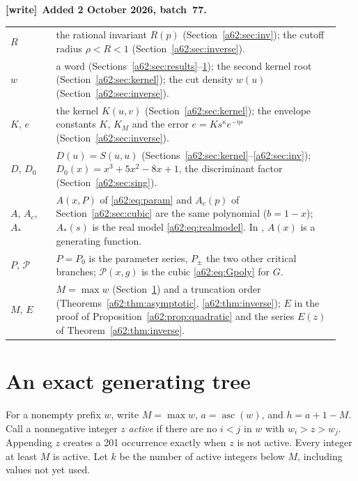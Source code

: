 \documentclass[11pt,letterpaper]{article}
\theoremstyle{remark}\newtheorem{remark}[theorem]{Remark}
\newcommand{\asc}{\operatorname{asc}}
\newenvironment{writenote}[1][]{\par\smallskip\begingroup\small
 \noindent\textbf{[write]}\if\relax\detokenize{#1}\relax\else~\textbf{#1.}\fi\ }%
 {\par\endgroup\smallskip}
\begin{document}
\begin{writenote}[Added 2 October 2026, batch~77]
\begin{center}
\begin{tabular}{@{}p{0.13\linewidth}p{0.81\linewidth}@{}}
$R$ & the rational invariant $R(p)$ (Section~\ref{a62:sec:inv}); the cutoff radius $\rho<R<1$ (Section~\ref{a62:sec:inverse}).\\
$w$ & a word (Sections~\ref{a62:sec:results}--\ref{a62:sec:tree}); the second kernel root (Section~\ref{a62:sec:kernel}); the cut density $w(u)$ (Section~\ref{a62:sec:inverse}).\\
$K$, $e$ & the kernel $K(u,v)$ (Section~\ref{a62:sec:kernel}); the envelope constants $K$, $K_M$ and the error $e=Ks^\kappa e^{-\eta s}$ (Section~\ref{a62:sec:inverse}).\\
$D$, $D_0$ & $D(u)=S(u,u)$ (Sections~\ref{a62:sec:kernel}--\ref{a62:sec:inv}); $D_0(x)=x^3+5x^2-8x+1$, the discriminant factor (Section~\ref{a62:sec:sing}).\\
$A$, $A_c$, $A_*$ & $A(x,P)$ of \eqref{a62:eq:param} and $A_c(p)$ of Section~\ref{a62:sec:cubic} are the same polynomial ($b=1-x$); $A_*(s)$ is the real model \eqref{a62:eq:realmodel}. In \cite{a62-a61}, $A(x)$ is a generating function.\\
$P$, $\mathcal P$ & $P=P_0$ is the parameter series, $P_\pm$ the two other critical branches; $\mathcal P(x,g)$ is the cubic \eqref{a62:eq:Gpoly} for $G$.\\
$M$, $E$ & $M=\max w$ (Section~\ref{a62:sec:tree}) and a truncation order (Theorems~\ref{a62:thm:asymptotic}, \ref{a62:thm:inverse}); $E$ in the proof of Proposition~\ref{a62:prop:quadratic} and the series $E(z)$ of Theorem~\ref{a62:thm:inverse}.\\
\bottomrule
\end{tabular}
\end{center}
\end{writenote}

\section{An exact generating tree}\label{a62:sec:tree}
For a nonempty prefix $w$, write $M=\max w$, $a=\asc(w)$, and $h=a+1-M$. Call a nonnegative integer $z$ \emph{active} if there are no $i<j$ in $w$ with $w_i>z>w_j$. Appending $z$ creates a 201 occurrence exactly when $z$ is not active. Every integer at least $M$ is active. Let $k$ be the number of active integers below $M$, including values not yet used.
\end{document}
